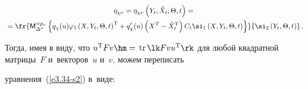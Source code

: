 \vspace*{-12pt}

    

    \noindent

    \begin{multline*}

    \eta_{\chi \nu} =  \eta_{\chi \nu} \left(Y_t,\hat X_t,\Theta,t\right) ={}\\

    {}=

    \fr{{\sf M}_{\Delta^x}^{w p_\nu} \left\{ 

    q_\chi (u) \varphi_1 \left(X,Y_t,\Theta,t\right)^{\mathrm{T}} + 

    q_\chi' (u)\left(X^{\mathrm{T}}-\hat X_t^{\mathrm{T}}\right) 

    C_t \si_1 \left(X,Y_t,\Theta,t\right)

\right\}}{\si_2 \left(Y_t,\Theta,t\right)}\,.


\end{multline*}

Тогда, имея в виду, что $u^{\mathrm{T}} F v\hm =\,\mathrm{tr}\, \lk F v u^{\mathrm{T}}

\rk$ для любой квадратной матрицы~$F$ и~векторов~$u$ и~$v$, можем переписать

уравнения~(\ref{e3.34-s2}) в~виде:



\noindent

